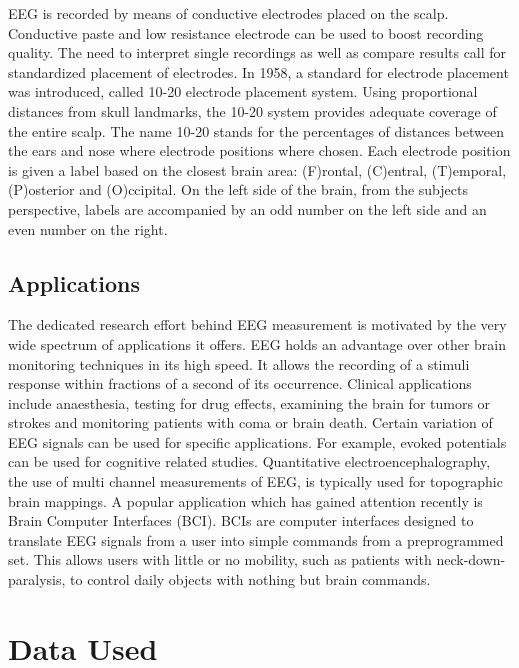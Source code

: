 \documentclass[12pt, a4paper, fleqn]{memoir}%
\begin{document}
EEG is recorded by means of conductive electrodes placed on the scalp. Conductive paste and low resistance electrode can be used to boost recording quality. The need to interpret single recordings as well as compare results call for standardized placement of electrodes. In 1958, a standard for electrode placement was introduced, called 10-20 electrode placement system. Using proportional distances from skull landmarks, the 10-20 system provides adequate coverage of the entire scalp. The name 10-20 stands for the percentages of distances between the ears and nose where electrode positions where chosen. Each electrode position is given a label based on the closest brain area: (F)rontal, (C)entral, (T)emporal, (P)osterior and (O)ccipital. On the left side of the brain, from the subjects perspective, labels are accompanied by an odd number on the left side and an even number on the right.

\section{Applications}
The dedicated research effort behind EEG measurement is motivated by the very wide spectrum of applications it offers. EEG holds an advantage over other brain monitoring techniques in its high speed. It allows the recording of a stimuli response within fractions of a second of its occurrence. Clinical applications include anaesthesia, testing for drug effects, examining the brain for tumors or strokes and monitoring patients with coma or brain death. Certain variation of EEG signals can be used for specific applications. For example, evoked potentials can be used for cognitive related studies. Quantitative electroencephalography, the use of multi channel measurements of EEG, is typically used for topographic brain mappings. A popular application which has gained attention recently is Brain Computer Interfaces (BCI). BCIs are computer interfaces designed to translate EEG signals from a user into simple commands from a preprogrammed set. This allows users with little or no mobility, such as patients with neck-down-paralysis, to control daily objects with nothing but brain commands.

\chapter{Data Used}
\label{chap:dataset}
\end{document}
